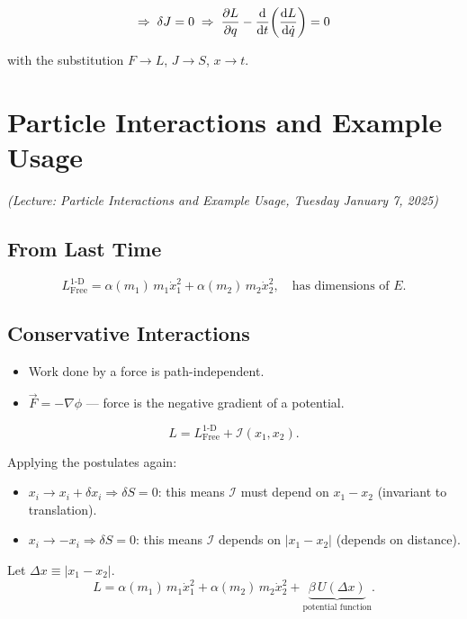 \[
    \Rightarrow\; \delta J = 0
    \;\Rightarrow\;
    \frac{\partial L}{\partial q} - \dv{t}\!\left(\dv{L}{\dot{q}}\right) = 0
\]

with the substitution $F \to L$, $J \to S$, $x \to t$.

\chapter{Particle Interactions and Example Usage}

\textit{(Lecture: Particle Interactions and Example Usage, Tuesday January 7, 2025)}

\section{From Last Time}

\[
    L_\mathrm{Free}^{1\text{-D}}
    = \alpha(m_1)\,m_1\dot{x}_1^2 + \alpha(m_2)\,m_2\dot{x}_2^2,
    \quad \text{has dimensions of } E.
\]

\section{Conservative Interactions}

\begin{itemize}
    \item Work done by a force is path-independent.
    \item $\vec{F} = -\nabla\phi$ — force is the negative gradient of a potential.
\end{itemize}

\[
    L = L_\mathrm{Free}^{1\text{-D}} + \mathcal{I}(x_1, x_2).
\]

Applying the postulates again:
\begin{itemize}
    \item $x_i \to x_i + \delta x_i \Rightarrow \delta S = 0$:
        this means $\mathcal{I}$ must depend on $x_1 - x_2$ (invariant to translation).
    \item $x_i \to -x_i \Rightarrow \delta S = 0$:
        this means $\mathcal{I}$ depends on $|x_1 - x_2|$ (depends on distance).
\end{itemize}

Let $\Delta x \equiv |x_1 - x_2|$.
\[
    L = \alpha(m_1)\,m_1\dot{x}_1^2 + \alpha(m_2)\,m_2\dot{x}_2^2
    + \underbrace{\beta\, U(\Delta x)}_{\text{potential function}}.
\]

